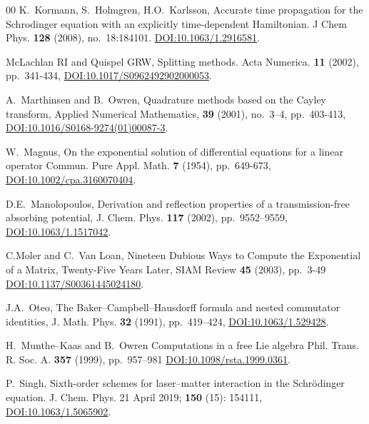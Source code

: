 \documentclass{article}
\begin{document}
\begin{thebibliography}{00}
K.~Kormann, S.~Holmgren, H.O.~Karlsson,
\newblock Accurate time propagation for the Schrodinger equation with an explicitly time-dependent Hamiltonian. 
\newblock J Chem Phys. \textbf{128} (2008), no.~18:184101. \href{http://doi.org/10.1063/1.2916581}{DOI:10.1063/1.2916581}. 


McLachlan RI and Quispel GRW,
\newblock Splitting methods. Acta Numerica. \textbf{11} (2002), pp.~341-434, \href{http://doi.org/10.1017/S0962492902000053}{DOI:10.1017/S0962492902000053}.



A.~Marthinsen and B.~Owren,
\newblock Quadrature methods based on the Cayley transform,
Applied Numerical Mathematics, \textbf{39} (2001), no.~3–4, pp.~403-413, \href{https://doi.org/10.1016/S0168-9274(01)00087-3}{DOI:10.1016/S0168-9274(01)00087-3}.


W.~Magnus, 
\newblock On the exponential solution of differential equations for a linear operator \newblock Commun. Pure Appl. Math. \textbf{7} (1954), pp.~649-673, \href{https://doi.org/10.1002/cpa.3160070404}{DOI:10.1002/cpa.3160070404}.


D.E.~Manolopoulos,
\newblock Derivation and reflection properties of a transmission-free absorbing potential,
\newblock J. Chem. Phys. \textbf{117} (2002), pp.~9552–9559, \href{https://doi.org/10.1063/1.1517042}{DOI:10.1063/1.1517042}. 


C.Moler and C.~Van Loan,
\newblock Nineteen Dubious Ways to Compute the Exponential of a Matrix, Twenty-Five Years Later,
\newblock SIAM Review \textbf{45} (2003), pp.~3-49    \href{https://doi.org/10.1137/S00361445024180}{DOI:10.1137/S00361445024180}.


J.A.~Oteo, 
\newblock The Baker–Campbell–Hausdorff formula and nested commutator identities, 
\newblock J. Math. Phys. \textbf{32} (1991), pp.~419–424, \href{https://doi.org/10.1063/1.529428}{DOI:10.1063/1.529428}.


H.~Munthe–Kaas and B.~Owren
\newblock Computations in a free Lie algebra
\newblock Phil. Trans. R. Soc. A. \textbf{357} (1999), pp.~957–981
\href{https://doi.org/10.1098/rsta.1999.0361}{DOI:10.1098/rsta.1999.0361}.


P.~Singh,
\newblock Sixth-order schemes for laser–matter interaction in the Schrödinger equation. 
\newblock J. Chem. Phys. 21 April 2019; \textbf{150} (15): 154111, \href{https://doi.org/10.1063/1.5065902}{DOI:10.1063/1.5065902}.



\end{thebibliography}
\end{document}
